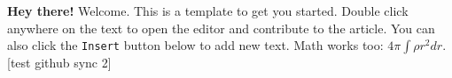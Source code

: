 \textbf{Hey there!} Welcome. This is a template to get you started. Double click anywhere on the text to open the editor and contribute to the article. You can also click the \verb|Insert| button below to add new text. Math works too: $4 \pi \int \rho r^2 dr$. [test github sync 2]